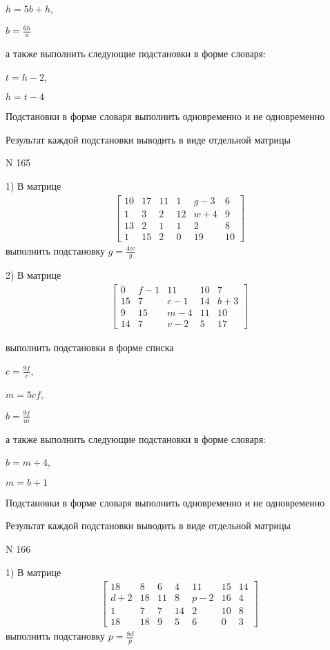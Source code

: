\documentclass[11pt]{report}
\begin{document}
$h=5 b + h$,

$b=\frac{6 h}{u}$

а также выполнить следующие подстановки в форме словаря:

$t=h - 2$,

$h=t - 4$


    Подстановки в форме словаря выполнить одновременно и не одновременно


    Результат каждой подстановки выводить в виде отдельной матрицы

\newpage
N 165


    1) В матрице
\begin{align*}
\left[\begin{matrix}10 & 17 & 11 & 1 & g - 3 & 6\\1 & 3 & 2 & 12 & w + 4 & 9\\13 & 2 & 1 & 1 & 2 & 8\\1 & 15 & 2 & 0 & 19 & 10\end{matrix}\right]
\end{align*}
выполнить подстановку $g=\frac{4 w}{g}$


    2) В матрице
\begin{align*}
\left[\begin{matrix}0 & f - 1 & 11 & 10 & 7\\15 & 7 & c - 1 & 14 & b + 3\\9 & 15 & m - 4 & 11 & 10\\14 & 7 & v - 2 & 5 & 17\end{matrix}\right]
\end{align*}

выполнить подстановки в форме списка

$c=\frac{9 f}{c}$,

$m=5 c f$,

$b=\frac{9 f}{m}$

а также выполнить следующие подстановки в форме словаря:

$b=m + 4$,

$m=b + 1$


    Подстановки в форме словаря выполнить одновременно и не одновременно


    Результат каждой подстановки выводить в виде отдельной матрицы

\newpage
N 166


    1) В матрице
\begin{align*}
\left[\begin{matrix}18 & 8 & 6 & 4 & 11 & 15 & 14\\d + 2 & 18 & 11 & 8 & p - 2 & 16 & 4\\1 & 7 & 7 & 14 & 2 & 10 & 8\\18 & 18 & 9 & 5 & 6 & 0 & 3\end{matrix}\right]
\end{align*}
выполнить подстановку $p=\frac{8 d}{p}$
\end{document}
